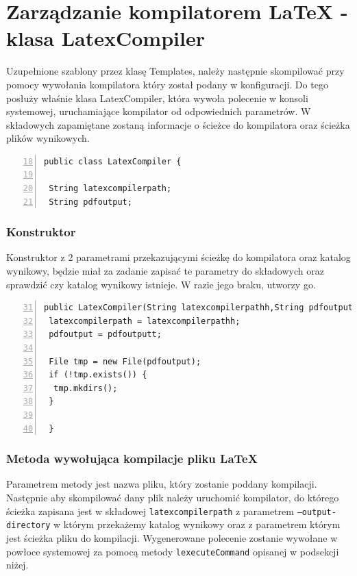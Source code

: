 \section{Zarządzanie kompilatorem LaTeX - klasa LatexCompiler}

Uzupełnione szablony przez klasę Templates, należy następnie skompilować przy pomocy wywołania kompilatora który został podany w konfiguracji.
Do tego posłuży właśnie klasa LatexCompiler, która wywoła polecenie w konsoli systemowej, uruchamiające kompilator od odpowiednich parametrów.
W składowych zapamiętane zostaną informacje o ścieżce do kompilatora oraz ścieżka plików wynikowych.

 \begin{lstlisting}[numbers=left,firstnumber=18]
public class LatexCompiler {
    
 String latexcompilerpath;
 String pdfoutput;
\end{lstlisting}

\subsubsection*{Konstruktor}
Konstruktor z 2 parametrami przekazującymi ścieżkę do kompilatora oraz katalog wynikowy, będzie miał za zadanie zapisać te parametry do składowych oraz sprawdzić czy katalog wynikowy istnieje. W razie jego braku, utworzy go.

 \begin{lstlisting}[numbers=left,firstnumber=31]
public LatexCompiler(String latexcompilerpathh,String pdfoutputt){
 latexcompilerpath = latexcompilerpathh;
 pdfoutput = pdfoutputt;

 File tmp = new File(pdfoutput);
 if (!tmp.exists()) {
  tmp.mkdirs();
 }
    
 }
\end{lstlisting}

\subsubsection*{Metoda wywołująca kompilacje pliku LaTeX}

Parametrem metody jest nazwa pliku, który zostanie poddany kompilacji.  Następnie aby skompilować dany plik należy uruchomić kompilator, do którego ścieżka zapisana jest w składowej \texttt{latexcompilerpath} z parametrem \texttt{--output-directory} w którym przekażemy katalog wynikowy oraz z parametrem którym jest ścieżka pliku do kompilacji. Wygenerowane polecenie zostanie wywołane w powłoce systemowej za pomocą metody \texttt{lexecuteCommand} opisanej w podsekcji niżej.

